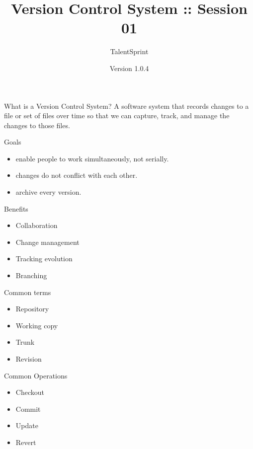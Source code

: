 \documentclass[14pt]{beamer}
\title[BPT:VCS:01]{Version Control System :: Session 01}
\author[TS]{TalentSprint}
\institute[L\&D]{Licensed To Skill}
\date{Version 1.0.4}
\begin{document}
\begin{frame}
  \titlepage
\end{frame}

\begin{frame}{What is a Version Control System?}
  A software system that records changes to a file or set of files over time so that we can capture, track, and manage the changes to those files.
\end{frame}

\begin{frame}{Goals}
  \begin{itemize}
  \item enable people to work simultaneously, not serially.
  \item changes do not conflict with each other.
  \item archive every version.
  \end{itemize}
\end{frame}

\begin{frame}{Benefits}
  \begin{itemize}
  \item Collaboration
    \pause
  \item Change management 
    \pause
  \item Tracking evolution 
    \pause
  \item Branching
  \end{itemize}
\end{frame}

\begin{frame}{Common terms}
  \begin{itemize}
  \item Repository 
    \pause
  \item Working copy 
    \pause
  \item Trunk 
    \pause
  \item Revision
  \end{itemize}
\end{frame}

\begin{frame}{Common Operations}
  \begin{itemize}
  \item Checkout
    \pause
  \item Commit 
    \pause
  \item Update
    \pause
  \item Revert 
  \end{itemize}
\end{frame}
\end{document}
